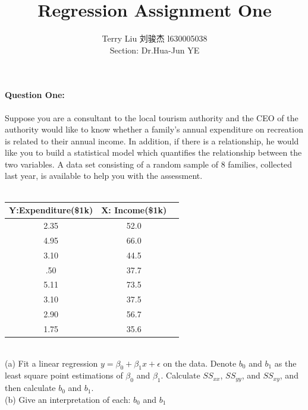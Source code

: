\documentclass[UTF8]{article}
\author {
Terry Liu 刘骏杰 l630005038 \\
Section: Dr.Hua-Jun YE}
\title {Regression Assignment One}
\begin{document}
\maketitle
  \paragraph{Question One:}
  Suppose you are a consultant to the local tourism authority and the CEO
  of the authority would like to know whether a family’s annual expenditure on
  recreation is related to their annual income. In addition, if there is a
  relationship, he would like you to build a statistical model which quantifies
  the relationship between the two variables. A data set consisting of a random
  sample of 8 families, collected last year, is available to help you with the
  assessment.
  \\
  \\
  \begin{tabular}{ccc}
    \hline
      Y:Expenditure(\$1k) & X: Income(\$1k)\\
    \hline
      2.35 & 52.0\\
      4.95 & 66.0\\
      3.10 & 44.5\\
      .50 & 37.7\\
      5.11 & 73.5\\
      3.10 & 37.5\\
      2.90 & 56.7\\
      1.75 & 35.6\\
    \hline
  \end{tabular}
  \\

  (a) Fit a linear regression $y = \beta_0 + \beta_1 x + \epsilon$ on the data.
  Denote $b_0$ and $b_1$ as the least square point estimations of $\beta_0$ and $\beta_1$.
  Calculate $SS_{xx}$, $SS_{yy}$, and $SS_{xy}$, and then calculate $b_0$ and $b_1$.
  \\
  (b) Give an interpretation of each: $b_0$ and $b_1$ \\
  \\
\end{document}
